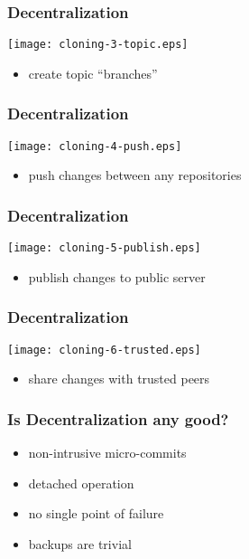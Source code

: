 \documentclass[english]{beamer}
\begin{document}
\begin{frame}
\frametitle{Decentralization}
\texttt{[image: cloning-3-topic.eps]}
\begin{itemize}
        \item create topic ``branches''
\end{itemize}
\end{frame}

\begin{frame}
\frametitle{Decentralization}
\texttt{[image: cloning-4-push.eps]}
\begin{itemize}
        \item push changes between any repositories
\end{itemize}
\end{frame}

\begin{frame}
\frametitle{Decentralization}
\texttt{[image: cloning-5-publish.eps]}
\begin{itemize}
        \item publish changes to public server
\end{itemize}
\end{frame}

\begin{frame}
\frametitle{Decentralization}
\texttt{[image: cloning-6-trusted.eps]}
\begin{itemize}
        \item share changes with trusted peers
\end{itemize}
\end{frame}

\begin{frame}
\frametitle{Is Decentralization any good?}

\begin{itemize}
        \item non-intrusive micro-commits
        \item detached operation
        \item no single point of failure
        \item backups are trivial
\end{itemize}
\end{frame}
\end{document}
